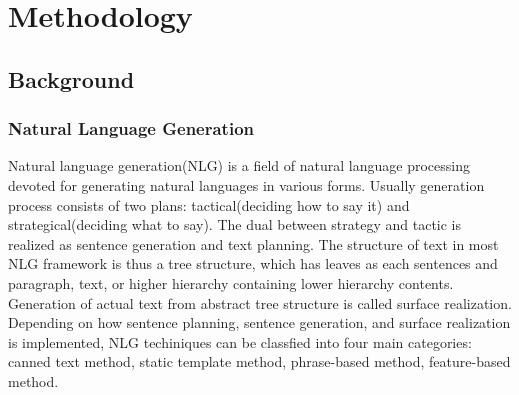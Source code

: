 \documentclass[11pt,letterpaper]{article}
\begin{document}

\section{Methodology} 


\subsection{Background} 

\subsubsection{Natural Language Generation} 

Natural language generation(NLG) is a field of natural language processing devoted for generating natural languages in various forms. Usually generation process consists of two plans: tactical(deciding how to say it) and strategical(deciding what to say). The dual between strategy and tactic is realized as sentence generation and text planning. The structure of text in most NLG framework is thus a tree structure, which has leaves as each sentences and paragraph, text, or higher hierarchy containing lower hierarchy contents. Generation of actual text from abstract tree structure is called surface realization. Depending on how sentence planning, sentence generation, and surface realization is implemented, NLG techiniques can be classfied into four main categories\cite{ency}: canned text method, static template method, phrase-based method, feature-based method. 
\end{document}
